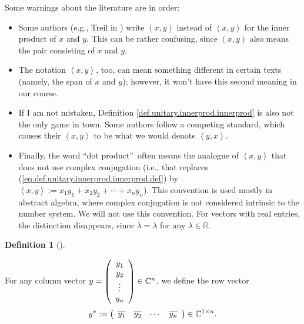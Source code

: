 \documentclass[numbers=enddot,12pt,final,onecolumn,notitlepage]{scrartcl}%
\numberwithin{exer}{subsection}
\theoremstyle{definition}
\newtheorem{defi}[theo]{Definition}
\newenvironment{definition}[1][]
{\begin{defi}[#1]\begin{leftbar}}
{\end{leftbar}\end{defi}}
\begin{document}
Some warnings about the literature are in order:

\begin{itemize}
\item Some authors (e.g., Treil in \cite{Treil15}) write $\left(  x,y\right)
$ instead of $\left\langle x,y\right\rangle $ for the inner product of $x$ and
$y$. This can be rather confusing, since $\left(  x,y\right)  $ also means the
pair consisting of $x$ and $y$.

\item The notation $\left\langle x,y\right\rangle $, too, can mean something
different in certain texts (namely, the span of $x$ and $y$); however, it
won't have this second meaning in our course.

\item If I am not mistaken, Definition \ref{def.unitary.innerprod.innerprod}
is also not the only game in town. Some authors follow a competing standard,
which causes their $\left\langle x,y\right\rangle $ to be what we would denote
$\left\langle y,x\right\rangle $.

\item Finally, the word \textquotedblleft dot product\textquotedblright\ often
means the analogue of $\left\langle x,y\right\rangle $ that does not use
complex conjugation (i.e., that replaces
(\ref{eq.def.unitary.innerprod.innerprod.def}) by $\left\langle
x,y\right\rangle :=x_{1}y_{1}+x_{2}y_{2}+\cdots+x_{n}y_{n}$). This convention
is used mostly in abstract algebra, where complex conjugation is not
considered intrinsic to the number system. We will not use this convention.
For vectors with real entries, the distinction disappears, since
$\overline{\lambda}=\lambda$ for any $\lambda\in\mathbb{R}$.
\end{itemize}

\begin{definition}
\label{def.unitary.innerprod.ystar}For any column vector $y=\left(
\begin{array}
[c]{c}%
y_{1}\\
y_{2}\\
\vdots\\
y_{n}%
\end{array}
\right)  \in\mathbb{C}^{n}$, we define the row vector
\[
y^{\ast}:=\left(
\begin{array}
[c]{cccc}%
\overline{y_{1}} & \overline{y_{2}} & \cdots & \overline{y_{n}}%
\end{array}
\right)  \in\mathbb{C}^{1\times n}.
\]

\end{definition}
\end{document}
